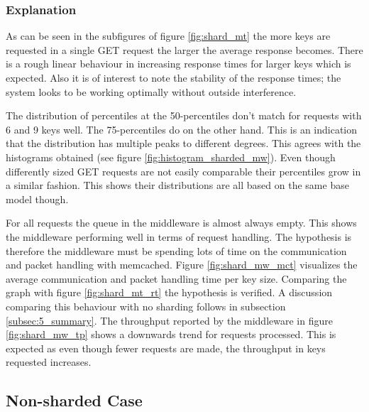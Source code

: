         \subsubsection{Explanation\label{subsubsec:5_sharded_summary}}

            As can be seen in the subfigures of figure \ref{fig:shard_mt} the more keys are requested in a single GET
            request the larger the average response becomes. There is a rough linear behaviour in increasing response
            times for larger keys which is expected. Also it is of interest to note the stability of the response times;
            the system looks to be working optimally without outside interference.

            The distribution of percentiles at the 50-percentiles don't match for requests with 6 and 9 keys well. The
            75-percentiles do on the other hand. This is an indication that the distribution has multiple peaks to
            different degrees. This agrees with the histograms obtained (see figure \ref{fig:histogram_sharded_mw}).
            Even though differently sized GET requests are not easily comparable their percentiles grow in a similar
            fashion. This shows their distributions are all based on the same base model though.

            For all requests the queue in the middleware is almost always empty. This shows the middleware performing
            well in terms of request handling. The hypothesis is therefore the middleware must be spending lots of time
            on the communication and packet handling with memcached. Figure \ref{fig:shard_mw_mct} visualizes the
            average communication and packet handling time per key size. Comparing the graph with figure
            \ref{fig:shard_mt_rt} the hypothesis is verified. A discussion comparing this behaviour with no sharding
            follows in subsection \ref{subsec:5_summary}.\newline
            The throughput reported by the middleware in figure \ref{fig:shard_mw_tp} shows a downwards trend for
            requests processed. This is expected as even though fewer requests are made, the throughput in keys
            requested increases.

    \subsection{Non-sharded Case\label{subsec:5_nonsharded}}

